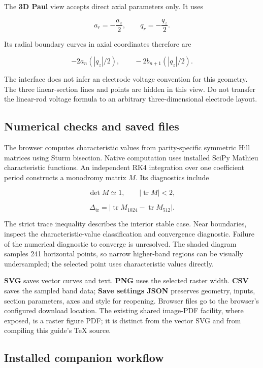 \documentclass[
  aps,
  onecolumn,
  11pt]{revtex4-2}
\begin{document}
The \textbf{3D Paul} view accepts direct axial parameters only. It uses

\[a_r=-\frac{a_z}{2},\qquad q_r=-\frac{q_z}{2}.\]

Its radial boundary curves in axial coordinates therefore are

\[-2a_n(|q_z|/2),\qquad -2b_{n+1}(|q_z|/2).\]

The interface does not infer an electrode voltage convention for this
geometry. The three linear-section lines and points are hidden in this
view. Do not transfer the linear-rod voltage formula to an arbitrary
three-dimensional electrode layout.

\subsection{Numerical checks and saved
files}\label{numerical-checks-and-saved-files}

The browser computes characteristic values from parity-specific
symmetric Hill matrices using Sturm bisection. Native computation uses
installed SciPy Mathieu characteristic functions. An independent RK4
integration over one coefficient period constructs a monodromy matrix
\(M\). Its diagnostics include

\[\det M\simeq1,\qquad |\operatorname{tr}M|<2,\]

\[\Delta_{\mathrm{tr}}=|\operatorname{tr}M_{1024}-\operatorname{tr}M_{512}|.\]

The strict trace inequality describes the interior stable case. Near
boundaries, inspect the characteristic-value classification and
convergence diagnostic. Failure of the numerical diagnostic to converge
is unresolved. The shaded diagram samples 241 horizontal points, so
narrow higher-band regions can be visually undersampled; the selected
point uses characteristic values directly.

\textbf{SVG} saves vector curves and text. \textbf{PNG} uses the
selected raster width. \textbf{CSV} saves the sampled band data;
\textbf{Save settings JSON} preserves geometry, inputs, section
parameters, axes and style for reopening. Browser files go to the
browser's configured download location. The existing shared image-PDF
facility, where exposed, is a raster figure PDF; it is distinct from the
vector SVG and from compiling this guide's TeX source.

\subsection{Installed companion
workflow}\label{installed-companion-workflow}
\end{document}
